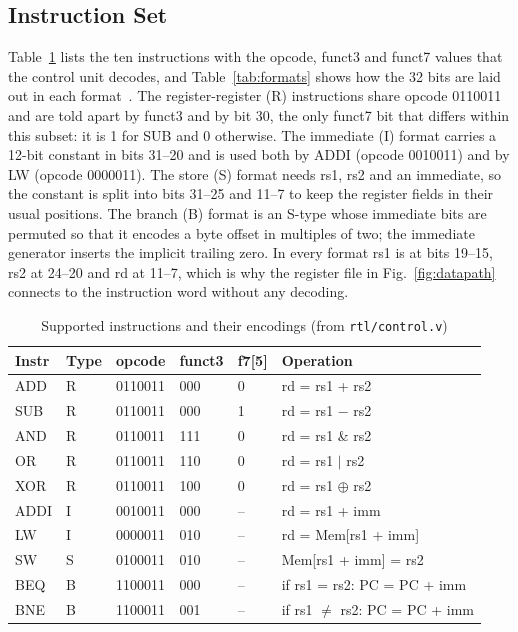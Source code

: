 \documentclass[conference]{IEEEtran}
\begin{document}
\subsection{Instruction Set}
Table~\ref{tab:isa} lists the ten instructions with the opcode, funct3 and
funct7 values that the control unit decodes, and Table~\ref{tab:formats} shows
how the 32 bits are laid out in each format~\cite{riscv_unpriv_2026}. The
register-register (R) instructions share opcode 0110011 and are told apart by
funct3 and by bit 30, the only funct7 bit that differs within this subset: it
is 1 for SUB and 0 otherwise. The immediate (I) format carries a 12-bit
constant in bits 31--20 and is used both by ADDI (opcode 0010011) and by LW
(opcode 0000011). The store (S) format needs rs1, rs2 and an immediate, so the
constant is split into bits 31--25 and 11--7 to keep the register fields in
their usual positions. The branch (B) format is an S-type whose immediate bits
are permuted so that it encodes a byte offset in multiples of two; the
immediate generator inserts the implicit trailing zero. In every format rs1 is
at bits 19--15, rs2 at 24--20 and rd at 11--7, which is why the register file
in Fig.~\ref{fig:datapath} connects to the instruction word without any
decoding.

\begin{table}[h]
\centering\scriptsize\setlength{\tabcolsep}{3pt}
\caption{Supported instructions and their encodings (from \texttt{rtl/control.v})}
\label{tab:isa}
\setlength{\tabcolsep}{2pt}\begin{tabular}{llllll}
\toprule
Instr & Type & opcode & funct3 & f7[5] & Operation \\
\midrule
ADD  & R & 0110011 & 000 & 0 & rd = rs1 + rs2 \\
SUB  & R & 0110011 & 000 & 1 & rd = rs1 $-$ rs2 \\
AND  & R & 0110011 & 111 & 0 & rd = rs1 \& rs2 \\
OR   & R & 0110011 & 110 & 0 & rd = rs1 $|$ rs2 \\
XOR  & R & 0110011 & 100 & 0 & rd = rs1 $\oplus$ rs2 \\
ADDI & I & 0010011 & 000 & -- & rd = rs1 + imm \\
LW   & I & 0000011 & 010 & -- & rd = Mem[rs1 + imm] \\
SW   & S & 0100011 & 010 & -- & Mem[rs1 + imm] = rs2 \\
BEQ  & B & 1100011 & 000 & -- & if rs1 = rs2: PC = PC + imm \\
BNE  & B & 1100011 & 001 & -- & if rs1 $\neq$ rs2: PC = PC + imm \\
\bottomrule
\end{tabular}
\end{table}
\end{document}

